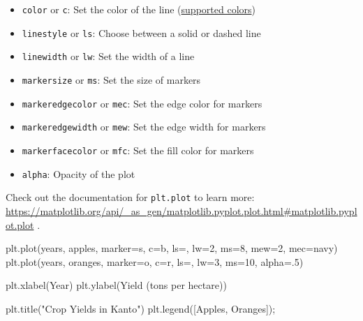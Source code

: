 \documentclass[
  letterpaper,
  DIV=11,
  numbers=noendperiod]{scrreprt}
\newenvironment{Shaded}{\begin{snugshade}}{\end{snugshade}}
\newcommand{\DecValTok}[1]{\textcolor[rgb]{0.68,0.00,0.00}{#1}}
\newcommand{\FloatTok}[1]{\textcolor[rgb]{0.68,0.00,0.00}{#1}}
\newcommand{\NormalTok}[1]{\textcolor[rgb]{0.00,0.23,0.31}{#1}}
\newcommand{\OperatorTok}[1]{\textcolor[rgb]{0.37,0.37,0.37}{#1}}
\newcommand{\StringTok}[1]{\textcolor[rgb]{0.13,0.47,0.30}{#1}}
\providecommand{\tightlist}{%
  \setlength{\itemsep}{0pt}\setlength{\parskip}{0pt}}\usepackage{longtable,booktabs,array}
\begin{document}
\begin{itemize}
\tightlist
\item
  \texttt{color} or \texttt{c}: Set the color of the line
  (\href{https://matplotlib.org/3.1.0/gallery/color/named_colors.html}{supported
  colors})
\item
  \texttt{linestyle} or \texttt{ls}: Choose between a solid or dashed
  line
\item
  \texttt{linewidth} or \texttt{lw}: Set the width of a line
\item
  \texttt{markersize} or \texttt{ms}: Set the size of markers
\item
  \texttt{markeredgecolor} or \texttt{mec}: Set the edge color for
  markers
\item
  \texttt{markeredgewidth} or \texttt{mew}: Set the edge width for
  markers
\item
  \texttt{markerfacecolor} or \texttt{mfc}: Set the fill color for
  markers
\item
  \texttt{alpha}: Opacity of the plot
\end{itemize}

Check out the documentation for \texttt{plt.plot} to learn more:
\url{https://matplotlib.org/api/_as_gen/matplotlib.pyplot.plot.html\#matplotlib.pyplot.plot}
.

\begin{Shaded}
\begin{Highlighting}[]
\NormalTok{plt.plot(years, apples, marker}\OperatorTok{=}\StringTok{\textquotesingle{}s\textquotesingle{}}\NormalTok{, c}\OperatorTok{=}\StringTok{\textquotesingle{}b\textquotesingle{}}\NormalTok{, ls}\OperatorTok{=}\StringTok{\textquotesingle{}{-}\textquotesingle{}}\NormalTok{, lw}\OperatorTok{=}\DecValTok{2}\NormalTok{, ms}\OperatorTok{=}\DecValTok{8}\NormalTok{, mew}\OperatorTok{=}\DecValTok{2}\NormalTok{, mec}\OperatorTok{=}\StringTok{\textquotesingle{}navy\textquotesingle{}}\NormalTok{)}
\NormalTok{plt.plot(years, oranges, marker}\OperatorTok{=}\StringTok{\textquotesingle{}o\textquotesingle{}}\NormalTok{, c}\OperatorTok{=}\StringTok{\textquotesingle{}r\textquotesingle{}}\NormalTok{, ls}\OperatorTok{=}\StringTok{\textquotesingle{}{-}{-}\textquotesingle{}}\NormalTok{, lw}\OperatorTok{=}\DecValTok{3}\NormalTok{, ms}\OperatorTok{=}\DecValTok{10}\NormalTok{, alpha}\OperatorTok{=}\FloatTok{.5}\NormalTok{)}

\NormalTok{plt.xlabel(}\StringTok{\textquotesingle{}Year\textquotesingle{}}\NormalTok{)}
\NormalTok{plt.ylabel(}\StringTok{\textquotesingle{}Yield (tons per hectare)\textquotesingle{}}\NormalTok{)}

\NormalTok{plt.title(}\StringTok{"Crop Yields in Kanto"}\NormalTok{)}
\NormalTok{plt.legend([}\StringTok{\textquotesingle{}Apples\textquotesingle{}}\NormalTok{, }\StringTok{\textquotesingle{}Oranges\textquotesingle{}}\NormalTok{])}\OperatorTok{;}
\end{Highlighting}
\end{Shaded}
\end{document}
